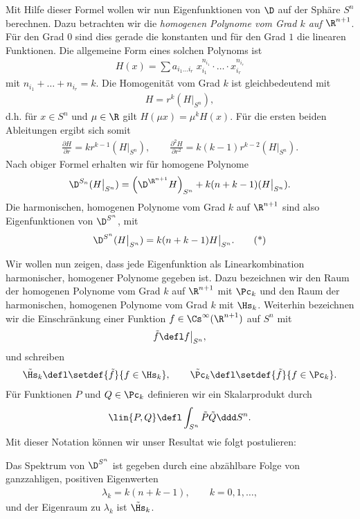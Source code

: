 \documentclass[%
	paper=a5,%
	fleqn,%
	DIV=18,%
	BCOR=0mm,
	fontsize=11pt,
	titlepage=false,%
	bibliography=totoc,
	DIV=18,%
	twoside=true,
	pdftitle=Riemannsche Geometrie,
	pdfauthor=Uwe Semmelmann,
	numbers=noendperiod]%
	{scrbook}
\begin{document}
Mit Hilfe dieser Formel wollen wir nun Eigenfunktionen von $\D$ auf der Sphäre $S^n$ berechnen. Dazu betrachten wir die \textit{homogenen Polynome vom Grad $k$ auf $\R^{n+1}$}. Für den Grad $0$ sind dies gerade die konstanten und für den Grad $1$ die linearen Funktionen. Die allgemeine Form eines solchen Polynoms ist
\begin{align*}
H(x) = \sum a_{i_{1}\ldots i_{r}} \; x_{i_{1}}^{n_{i_{1}}} \cdot \ldots \cdot x_{i_{r}}^{n_{i_{r}}}
\end{align*}
mit $n_{i_{1}}+\ldots+n_{i_{r}}=k$. Die Homogenität vom Grad $k$ ist gleichbedeutend mit
\begin{align*}
H = r^k (H\big|_{S^n}),
\end{align*}
d.h. für $x\in S^n$ und $\mu\in\R$ gilt $H(\mu x) = \mu^k H(x)$. Für die ersten beiden Ableitungen ergibt sich somit
\begin{align*}
\frac{\partial H}{\partial r} = kr^{k-1} (H\big|_{S^n}),\qquad
\frac{\partial^2 H}{\partial r^2} = k(k-1)r^{k-2} (H\big|_{S^n}).
\end{align*}
Nach obiger Formel erhalten wir für homogene Polynome
\begin{align*}
\D^{S_{n}}(H\big|_{S^n}) = 
\left(\D^{\R^{n+1}} H\right)_{S^n} + 
k(n+k-1) (H\big|_{S^n}).
\end{align*}
Die harmonischen, homogenen Polynome vom Grad $k$ auf $\R^{n+1}$ sind also Eigenfunktionen von $\D^{S^n}$, mit
\begin{align*}
\D^{S^n}(H\big|_{S^n}) = k(n+k-1) H\big|_{S^n}.\tag{*}
\end{align*}

Wir wollen nun zeigen, dass jede Eigenfunktion als Linearkombination harmonischer, homogener Polynome gegeben ist. Dazu bezeichnen wir den Raum der homogenen Polynome vom Grad $k$ auf $\R^{n+1}$ mit $\Pc_{k}$ und den Raum der harmonischen, homogenen Polynome vom Grad $k$ mit $\Hs_{k}$. Weiterhin bezeichnen wir die Einschränkung einer Funktion $f\in\Cs ^\infty(\R^{n+1})$ auf $S^n$ mit
\begin{align*}
\tilde{f} \defl f\big|_{S^n},
\end{align*}
und schreiben
\begin{align*}
\tilde\Hs_{k} \defl \setdef{\tilde{f}}{f\in\Hs_{k}},\qquad \tilde\Pc_{k} \defl \setdef{\tilde{f}}{f\in\Pc_{k}}.
\end{align*}
Für Funktionen $P$ und $Q\in\Pc_{k}$ definieren wir ein Skalarprodukt durch
\begin{align*}
\lin{P,Q} \defl \int_{S^n} \tilde P \tilde Q\ddd S^n.
\end{align*}
Mit dieser Notation können wir unser Resultat wie folgt postulieren:
\begin{prop}
Das Spektrum von $\D^{S^n}$ ist gegeben durch eine abzählbare Folge von ganzzahligen, positiven Eigenwerten
\begin{align*}
\lambda_{k} = k(n+k-1),\qquad k=0,1,\ldots,
\end{align*}
und der Eigenraum zu $\lambda_{k}$ ist $\tilde\Hs_{k}$.\fish
\end{prop}
\end{document}

